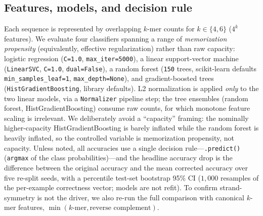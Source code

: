 \documentclass[webpdf,modern,large,namedate]{oup-authoring-template}%
\begin{document}
\subsection{Features, models, and decision rule}
Each sequence is represented by overlapping $k$-mer counts for $k\in\{4,6\}$ ($4^k$ features). We evaluate four classifiers spanning a range of \emph{memorization propensity} (equivalently, effective regularization) rather than raw capacity: logistic regression (\texttt{C=1.0}, \texttt{max\_iter=5000}), a linear support-vector machine (\texttt{LinearSVC}, \texttt{C=1.0}, \texttt{dual=False}), a random forest (\texttt{150} trees, scikit-learn defaults \texttt{min\_samples\_leaf=1}, \texttt{max\_depth=None}), and gradient-boosted trees (\texttt{HistGradientBoosting}, library defaults). L2 normalization is applied \emph{only} to the two linear models, via a \texttt{Normalizer} pipeline step; the tree ensembles (random forest, HistGradientBoosting) consume raw counts, for which monotone feature scaling is irrelevant. We deliberately avoid a ``capacity'' framing: the nominally higher-capacity HistGradientBoosting is barely inflated while the random forest is heavily inflated, so the controlled variable is memorization propensity, not capacity. Unless noted, all accuracies use a single decision rule---\texttt{.predict()} (\texttt{argmax} of the class probabilities)---and the headline accuracy drop is the difference between the original accuracy and the mean corrected accuracy over five re-split seeds, with a percentile test-set bootstrap 95\% CI ($1{,}000$ resamples of the per-example correctness vector; models are not refit). To confirm strand-symmetry is not the driver, we also re-run the full comparison with canonical $k$-mer features, $\min(k\text{-mer},\text{reverse complement})$.
\end{document}
